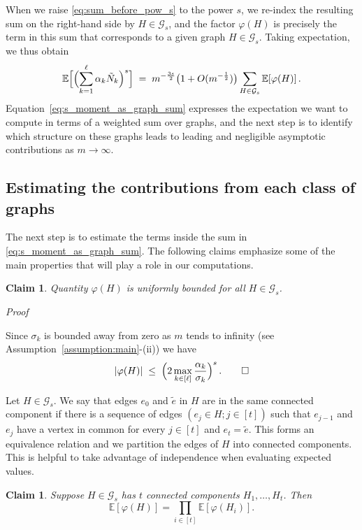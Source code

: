 \documentclass[reqno,a4paper,11pt]{amsart}
\makeatletter
\newtheorem{claim}[lemma]{Claim}
\theoremstyle{remark}
\newcommand{\mc}[1]{{\mathcal #1}}
\newcommand{\bb}[1]{{\mathbb #1}}
\numberwithin{equation}{section}
\renewenvironment{proof}[1][Proof]{\par
\pushQED{\qed}%
\normalfont \topsep6\p@\@plus6\p@\relax
\trivlist
\item\relax
{\itshape
#1\@addpunct{.}}\hspace\labelsep\ignorespaces
}{%
\popQED\endtrivlist\@endpefalse
}
\makeatother
\begin{document}
When we raise \eqref{eq:sum_before_pow_s} to the power $s$, we re-index the resulting sum on the right-hand side by $H\in \mc G_s$, and the factor $\varphi(H)$ is precisely the term in this sum that corresponds to a given graph $H\in\mc G_s$. Taking expectation, we thus obtain
%
\begin{equation}
\label{eq:s_moment_as_graph_sum}
\bb E\Bigl[ \Bigl(\sum_{k=1}^{\ell}\alpha_k \tilde{N}_k\Bigr)^{s}\Bigr]
    \;=\; m^{-\frac{3s}{2}} \bigl(1 + O(m^{-\frac{1}{2}})\bigr)
        \sum_{H \in \mc G_s} \bb E[\varphi(H)]\,.
\end{equation}
%
Equation~\eqref{eq:s_moment_as_graph_sum} expresses the expectation we want to compute in terms of a weighted sum over graphs, and the next step is to identify which structure on these graphs leads to leading and negligible asymptotic contributions as $m\to\infty$.

\subsection{Estimating the contributions from each class of graphs}
\label{sec:graphscounting}\hfill 

The next step is to estimate the terms inside the sum in \eqref{eq:s_moment_as_graph_sum}. The following claims emphasize
some of the main properties that will play a role in our computations.

\begin{claim}
\label{claim:boundedness}
Quantity $\varphi(H)$ is uniformly bounded for all $H \in \mc G_s$.
\end{claim}

\begin{proof}
Since $\sigma_k$ is bounded away from zero as $m$ tends to
infinity (see Assumption~\ref{assumption:main}-(ii)) we have
\begin{equation*}
\label{eq:varphi_H_unif_bound}
|\varphi(H)| \;\le\; \Bigl(2\max_{k \in [\ell]} \frac{\alpha_k}{\sigma_k}\Bigr)^s\,.
    \qedhere
\end{equation*}
\end{proof}

Let $H \in \mc G_s$. We say that edges $e_0$ and $\tilde{e}$ in $H$ are in the
same connected component if there is a sequence of edges $(e_j \in H; j \in [t])$
such that $e_{j-1}$ and $e_{j}$ have a vertex in common for every $j \in [t]$
and $e_t = \tilde{e}$. This forms an equivalence relation and we
partition the edges of $H$ into connected components. This is helpful to
take advantage of independence when evaluating expected values.
\begin{claim}
\label{claim:indep_components}
Suppose $H \in \mc G_s$ has $t$ connected components $H_1, \ldots, H_t$.
    Then 
%    
    $$
    \bb E [\varphi(H)] = \prod_{i \in [t]} \bb E[\varphi(H_i)].
    $$
\end{claim}
\end{document}
